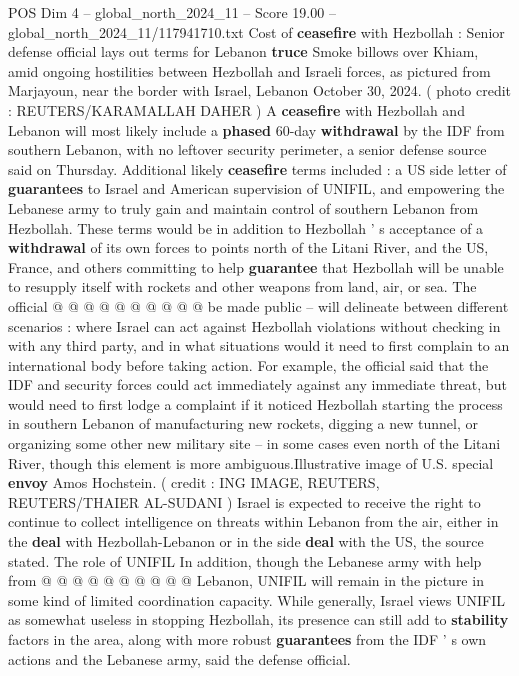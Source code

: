 \begin{textsample}{POS Dim 4 – global\_north\_2024\_11 – Score 19.00 – global\_north\_2024\_11/117941710.txt}  \label{ex:f4_pos_295}
Cost of \textbf{ceasefire} with Hezbollah : Senior defense official lays out terms for Lebanon \textbf{truce} Smoke billows over Khiam, amid ongoing hostilities between Hezbollah and Israeli forces, as pictured from Marjayoun, near the border with Israel, Lebanon October 30, 2024. ( photo credit : REUTERS/KARAMALLAH DAHER ) A \textbf{ceasefire} with Hezbollah and Lebanon will most likely include a \textbf{phased} 60-day \textbf{withdrawal} by the IDF from southern Lebanon, with no leftover security perimeter, a senior defense source said on Thursday.
Additional likely \textbf{ceasefire} terms included : a US side letter of \textbf{guarantees} to Israel and American supervision of UNIFIL, and empowering the Lebanese army to truly gain and maintain control of southern Lebanon from Hezbollah.
These terms would be in addition to Hezbollah ' s acceptance of a \textbf{withdrawal} of its own forces to points north of the Litani River, and the US, France, and others committing to help \textbf{guarantee} that Hezbollah will be unable to resupply itself with rockets and other weapons from land, air, or sea.
The official @ @ @ @ @ @ @ @ @ @ be made public -- will delineate between different scenarios : where Israel can act against Hezbollah violations without checking in with any third party, and in what situations would it need to first complain to an international body before taking action.
For example, the official said that the IDF and security forces could act immediately against any immediate threat, but would need to first lodge a complaint if it noticed Hezbollah starting the process in southern Lebanon of manufacturing new rockets, digging a new tunnel, or organizing some other new military site -- in some cases even north of the Litani River, though this element is more ambiguous.Illustrative image of U.S. special \textbf{envoy} Amos Hochstein. ( credit : ING IMAGE, REUTERS, REUTERS/THAIER AL-SUDANI ) Israel is expected to receive the right to continue to collect intelligence on threats within Lebanon from the air, either in the \textbf{deal} with Hezbollah-Lebanon or in the side \textbf{deal} with the US, the source stated.
The role of UNIFIL In addition, though the Lebanese army with help from @ @ @ @ @ @ @ @ @ @ Lebanon, UNIFIL will remain in the picture in some kind of limited coordination capacity.
While generally, Israel views UNIFIL as somewhat useless in stopping Hezbollah, its presence can still add to \textbf{stability} factors in the area, along with more robust \textbf{guarantees} from the IDF ' s own actions and the Lebanese army, said the defense official.

\end{textsample}
